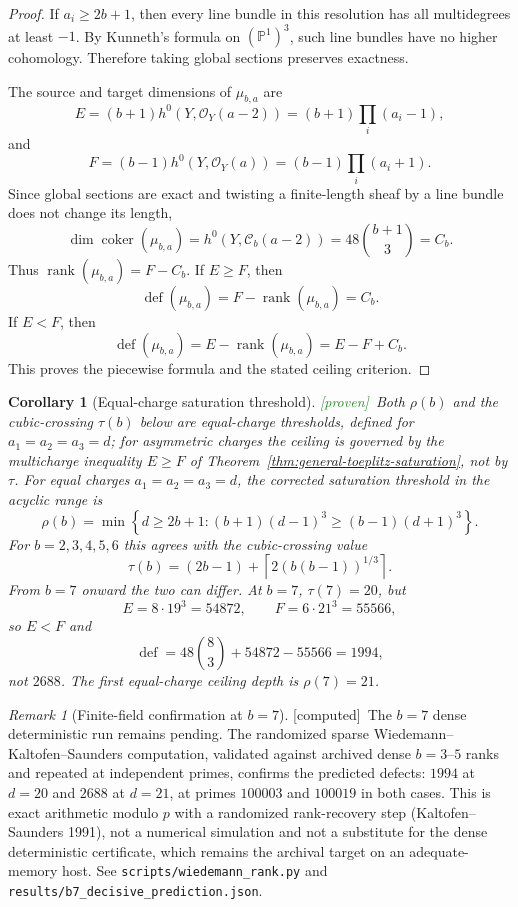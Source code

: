 \documentclass[11pt]{article}
\theoremstyle{plain}
\newtheorem{corollary}[theorem]{Corollary}
\theoremstyle{definition}
\theoremstyle{remark}
\newtheorem{remark}[theorem]{Remark}
\newcommand{\Proven}{\textcolor{ForestGreen}{\textsf{[proven]}}}
\newcommand{\Computed}{\textcolor{Sepia}{\textsf{[computed]}}}
\newcommand{\PP}{\mathbb{P}}
\newcommand{\cO}{\mathcal{O}}
\newcommand{\cC}{\mathcal{C}}
\newcommand{\rank}{\operatorname{rank}}
\newcommand{\defect}{\operatorname{def}}
\DeclareMathOperator{\Coker}{coker}
\begin{document}
\begin{proof}
If $a_i\ge2b+1$, then every line bundle in this resolution has all multidegrees at least $-1$.  By Kunneth's formula on $(\PP^1)^3$, such line bundles have no higher cohomology.  Therefore taking global sections preserves exactness.

The source and target dimensions of $\mu_{b,a}$ are
\[
E=(b+1)h^0(Y,\cO_Y(a-2))=(b+1)\prod_i(a_i-1),
\]
and
\[
F=(b-1)h^0(Y,\cO_Y(a))=(b-1)\prod_i(a_i+1).
\]
Since global sections are exact and twisting a finite-length sheaf by a line bundle does not change its length,
\[
\dim\Coker(\mu_{b,a})=h^0(Y,\cC_b(a-2))=48\binom{b+1}{3}=C_b.
\]
Thus $\rank(\mu_{b,a})=F-C_b$.  If $E\ge F$, then
\[
\defect(\mu_{b,a})=F-\rank(\mu_{b,a})=C_b.
\]
If $E<F$, then
\[
\defect(\mu_{b,a})=E-\rank(\mu_{b,a})=E-F+C_b.
\]
This proves the piecewise formula and the stated ceiling criterion.
\end{proof}

\begin{corollary}[Equal-charge saturation threshold]\label{cor:rho}
\Proven\ Both $\rho(b)$ and the cubic-crossing $\tau(b)$ below are \emph{equal-charge} thresholds, defined for $a_1=a_2=a_3=d$; for asymmetric charges the ceiling is governed by the multicharge inequality $E\ge F$ of Theorem~\ref{thm:general-toeplitz-saturation}, not by $\tau$.  For equal charges $a_1=a_2=a_3=d$, the corrected saturation threshold in the acyclic range is
\[
\rho(b)=\min\left\{d\ge2b+1:(b+1)(d-1)^3\ge(b-1)(d+1)^3\right\}.
\]
For $b=2,3,4,5,6$ this agrees with the cubic-crossing value
\[
\tau(b)=(2b-1)+\left\lceil2(b(b-1))^{1/3}\right\rceil.
\]
From $b=7$ onward the two can differ.  At $b=7$, $\tau(7)=20$, but
\[
E=8\cdot19^3=54872,
\qquad
F=6\cdot21^3=55566,
\]
so $E<F$ and
\[
\defect=48\binom{8}{3}+54872-55566=1994,
\]
not $2688$.  The first equal-charge ceiling depth is $\rho(7)=21$.
\end{corollary}

\begin{remark}[Finite-field confirmation at $b=7$]\label{rem:b7sparse}
\Computed\ The $b=7$ dense deterministic run remains pending. The randomized sparse Wiedemann--Kaltofen--Saunders computation, validated against archived dense $b=3$--$5$ ranks and repeated at independent primes, confirms the predicted defects: $1994$ at $d=20$ and $2688$ at $d=21$, at primes $100003$ and $100019$ in both cases. This is exact arithmetic modulo $p$ with a randomized rank-recovery step (Kaltofen--Saunders 1991), not a numerical simulation and not a substitute for the dense deterministic certificate, which remains the archival target on an adequate-memory host. See \texttt{scripts/wiedemann\_rank.py} and \texttt{results/b7\_decisive\_prediction.json}.
\end{remark}
\end{document}
